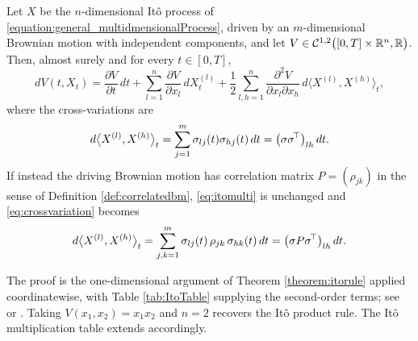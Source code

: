 


\begin{theorem}\label{thm:itomulti}
Let $X$ be the $n$-dimensional Itô process of
\eqref{equation:general_multidmensionalProcess}, driven by an $m$-dimensional Brownian motion
with independent components, and let
$V \in \mathcal{C}^{1,2}\bigl([0,T]\times\mathbb{R}^n,\mathbb{R}\bigr)$.
Then, almost surely and for every $t \in [0,T]$,
\begin{equation}\label{eq:itomulti}
dV(t,X_t) = \frac{\partial V}{\partial t}\,dt
 + \sum_{l=1}^{n}\frac{\partial V}{\partial x_l}\,dX^{(l)}_t
 + \frac12 \sum_{l,h=1}^{n} \frac{\partial^2 V}{\partial x_l \partial x_h}\,d\bigl\langle X^{(l)},X^{(h)}\bigr\rangle_t ,
\end{equation}
where the cross-variations are
\begin{equation}\label{eq:crossvariation}
d\bigl\langle X^{(l)},X^{(h)}\bigr\rangle_t
 = \sum_{j=1}^{m}\sigma_{lj}(t)\sigma_{hj}(t)\,dt
 = \bigl(\sigma\sigma^{\!\top}\bigr)_{lh}\,dt .
\end{equation}
If instead the driving Brownian motion has correlation matrix $P = (\rho_{jk})$ in the sense of
Definition \ref{def:correlatedbm}, \eqref{eq:itomulti} is unchanged and
\eqref{eq:crossvariation} becomes
\begin{equation}\label{eq:crossvariationcorrelated}
d\bigl\langle X^{(l)},X^{(h)}\bigr\rangle_t
 = \sum_{j,k=1}^{m}\sigma_{lj}(t)\,\rho_{jk}\,\sigma_{hk}(t)\,dt
 = \bigl(\sigma P \sigma^{\!\top}\bigr)_{lh}\,dt .
\end{equation}
\qedopen
\end{theorem}

The proof is the one-dimensional argument of Theorem \ref{theorem:itorule} applied coordinatewise,
with Table \ref{tab:ItoTable} supplying the second-order terms; see
\cite[Ch.\ 7]{kuo2006} or \cite[Ch.\ 4]{oksendal2003}. Taking $V(x_1,x_2) = x_1x_2$ and $n=2$
recovers the Itô product rule. The Itô multiplication table extends accordingly.

